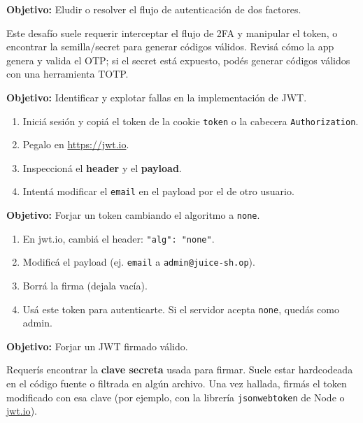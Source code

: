 \documentclass[11pt,a4paper]{article}
\begin{document}
\begin{desafio}
\textbf{Objetivo:} Eludir o resolver el flujo de autenticación de dos factores.
\begin{solucion}
Este desafío suele requerir interceptar el flujo de 2FA y manipular el token, o encontrar la semilla/secret para generar códigos válidos. Revisá cómo la app genera y valida el OTP; si el secret está expuesto, podés generar códigos válidos con una herramienta TOTP.
\end{solucion}
\end{desafio}

\begin{desafio}
\textbf{Objetivo:} Identificar y explotar fallas en la implementación de JWT.
\begin{solucion}
\begin{enumerate}[leftmargin=*]
  \item Iniciá sesión y copiá el token de la cookie \texttt{token} o la cabecera \texttt{Authorization}.
  \item Pegalo en \url{https://jwt.io}.
  \item Inspeccioná el \textbf{header} y el \textbf{payload}.
  \item Intentá modificar el \texttt{email} en el payload por el de otro usuario.
\end{enumerate}
\end{solucion}
\end{desafio}

\begin{desafio}
\textbf{Objetivo:} Forjar un token cambiando el algoritmo a \texttt{none}.
\begin{solucion}
\begin{enumerate}[leftmargin=*]
  \item En jwt.io, cambiá el header: \texttt{"alg": "none"}.
  \item Modificá el payload (ej. \texttt{email} a \texttt{admin@juice-sh.op}).
  \item Borrá la firma (dejala vacía).
  \item Usá este token para autenticarte. Si el servidor acepta \texttt{none}, quedás como admin.
\end{enumerate}
\end{solucion}
\end{desafio}

\begin{desafio}
\textbf{Objetivo:} Forjar un JWT firmado válido.
\begin{solucion}
Requerís encontrar la \textbf{clave secreta} usada para firmar. Suele estar hardcodeada en el código fuente o filtrada en algún archivo. Una vez hallada, firmás el token modificado con esa clave (por ejemplo, con la librería \texttt{jsonwebtoken} de Node o \url{jwt.io}).
\end{solucion}
\end{desafio}
\end{document}
